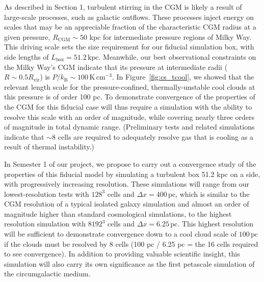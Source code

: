 \documentclass[11pt,letterpaper,english]{article}
\begin{document}
As described in Section 1, turbulent stirring in the CGM is likely a result of large-scale processes, such as galactic outflows. These processes inject energy on scales that may be an appreciable fraction of the characteristic CGM radius at a given pressure, $R_\mathrm{CGM} \sim 50$ kpc for intermediate pressure regions of Milky Way. This driving scale sets the size requirement for our fiducial simulation box, with side lengths of $L_\mathrm{box} = 51.2\,\mathrm{kpc}$. Meanwhile, our best observational constraints on the Milky Way's CGM indicate that its pressure at intermediate radii ($R \sim 0.5 R_\mathrm{vir}$) is $P/k_\mathrm{B} \sim 100\,\mathrm{K}\,\mathrm{cm}^{-3}$. In Figure~\ref{fig:cs_tcool}, we showed that the relevant length scale for the pressure-confined, thermally-unstable cool clouds at this pressure is of order 100 pc. To demonstrate convergence of the properties of the CGM for this fiducial case will thus require a simulation with the ability to resolve this scale with an order of magnitude, while covering nearly three orders of magnitude in total dynamic range. (Preliminary tests and related simulations indicate that ${\sim}8$ cells are required to adequately resolve gas that is cooling as a result of thermal instability.) %

In Semester 1 of our project, we propose to carry out a convergence study of the properties of this fiducial model by simulating a turbulent box 51.2 kpc on a side, with progressively increasing resolution. These simulations will range from our lowest-resolution tests with $128^3$ cells and $\Delta x = 400\,\mathrm{pc}$, which is similar to the CGM resolution of a typical isolated galaxy simulation and almost an order of magnitude higher than standard cosmological simulations, to the highest resolution simulation with $8192^3$ cells and $\Delta x = 6.25\,\mathrm{pc}$. This highest resolution will be sufficient to demonstrate convergence down to a cool cloud scale of $100\,\mathrm{pc}$ if the clouds must be resolved by 8 cells (100 pc / 6.25 pc = the 16 cells required to see convergence). In addition to providing valuable scientific insight, this simulation will also carry its own significance as the first petascale simulation of the circumgalactic medium.
\end{document}

